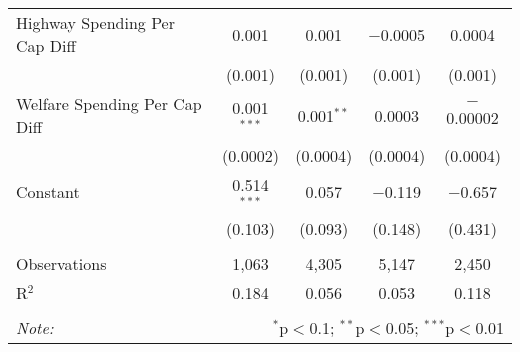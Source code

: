 \begin{table}[!htbp]
\begin{tabular}{@{\extracolsep{5pt}}lcccc}
  Highway Spending Per Cap Diff & 0.001 & 0.001 & $-$0.0005 & 0.0004 \\ 
  & (0.001) & (0.001) & (0.001) & (0.001) \\ 
  Welfare Spending Per Cap Diff & 0.001$^{***}$ & 0.001$^{**}$ & 0.0003 & $-$0.00002 \\ 
  & (0.0002) & (0.0004) & (0.0004) & (0.0004) \\ 
  Constant & 0.514$^{***}$ & 0.057 & $-$0.119 & $-$0.657 \\ 
  & (0.103) & (0.093) & (0.148) & (0.431) \\ 
 \hline \\[-1.8ex] 
Observations & 1,063 & 4,305 & 5,147 & 2,450 \\ 
R$^{2}$ & 0.184 & 0.056 & 0.053 & 0.118 \\ 
\hline 
\hline \\[-1.8ex] 
\textit{Note:}  & \multicolumn{4}{r}{$^{*}$p$<$0.1; $^{**}$p$<$0.05; $^{***}$p$<$0.01} \\ 
\end{tabular} 
\end{table} 
